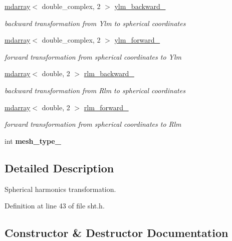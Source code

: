 \begin{DoxyCompactItemize}
\item 
\hyperlink{classsddk_1_1mdarray}{mdarray}$<$ double\+\_\+complex, 2 $>$ \hyperlink{classsirius_1_1_s_h_t_a9a22762aaf95b2e344b4b4ae104606e8}{ylm\+\_\+backward\+\_\+}
\begin{DoxyCompactList}\small\item\em backward transformation from Ylm to spherical coordinates \end{DoxyCompactList}\item 
\hyperlink{classsddk_1_1mdarray}{mdarray}$<$ double\+\_\+complex, 2 $>$ \hyperlink{classsirius_1_1_s_h_t_a2a7d448857ccb43d7a7a4cf5c1b1de40}{ylm\+\_\+forward\+\_\+}
\begin{DoxyCompactList}\small\item\em forward transformation from spherical coordinates to Ylm \end{DoxyCompactList}\item 
\hyperlink{classsddk_1_1mdarray}{mdarray}$<$ double, 2 $>$ \hyperlink{classsirius_1_1_s_h_t_a63ed79c5a767d8c0f950f46a736e6281}{rlm\+\_\+backward\+\_\+}
\begin{DoxyCompactList}\small\item\em backward transformation from Rlm to spherical coordinates \end{DoxyCompactList}\item 
\hyperlink{classsddk_1_1mdarray}{mdarray}$<$ double, 2 $>$ \hyperlink{classsirius_1_1_s_h_t_a9bf2864722425da105299d52cb93dba8}{rlm\+\_\+forward\+\_\+}
\begin{DoxyCompactList}\small\item\em forward transformation from spherical coordinates to Rlm \end{DoxyCompactList}\item 
\hypertarget{classsirius_1_1_s_h_t_a3bc29a4384bbe43d449dadada7a48d11}{}int {\bfseries mesh\+\_\+type\+\_\+}\label{classsirius_1_1_s_h_t_a3bc29a4384bbe43d449dadada7a48d11}

\end{DoxyCompactItemize}


\subsection{Detailed Description}
Spherical harmonics transformation. 

Definition at line 43 of file sht.\+h.



\subsection{Constructor \& Destructor Documentation}
\hypertarget{classsirius_1_1_s_h_t_ac405f7103925e591e2525d2ccc763ed1}{}
